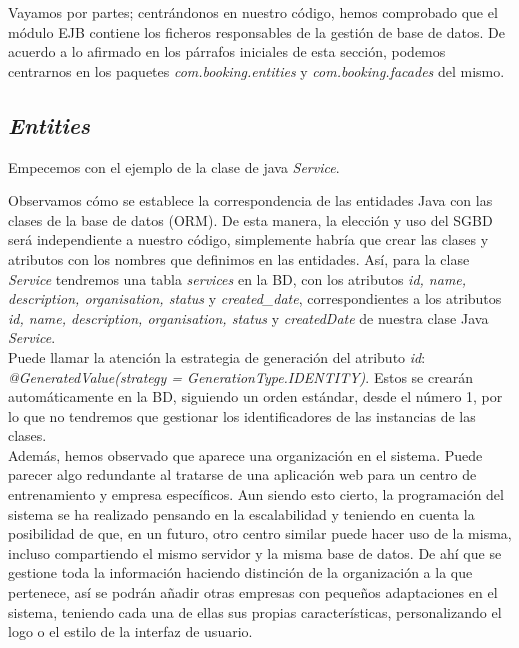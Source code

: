 Vayamos por partes; centrándonos en nuestro código, hemos comprobado que el módulo EJB contiene los ficheros responsables de la gestión de base de datos. De acuerdo a lo afirmado en los párrafos iniciales de esta sección, podemos centrarnos en los paquetes \textit{com.booking.entities} y \textit{com.booking.facades} del mismo. \\

\subsection{\textit{Entities}} \label{subsec:entities}

Empecemos con el ejemplo de la clase de java \textit{Service}.



Observamos cómo se establece la correspondencia de las entidades Java con las clases de la base de datos (ORM). De esta manera, la elección y uso del SGBD será independiente a nuestro código, simplemente habría que crear las clases y atributos con los nombres que definimos en las entidades. Así, para la clase \textit{Service} tendremos una tabla \textit{services} en la BD, con los atributos \textit{id, name, description, organisation, status} y \textit{created\_date}, correspondientes a los atributos \textit{id, name, description, organisation, status} y \textit{createdDate} de nuestra clase Java \textit{Service}. \\

Puede llamar la atención la estrategia de generación del atributo \textit{id}: \textit{@GeneratedValue(strategy = GenerationType.IDENTITY)}. Estos se crearán automáticamente en la BD, siguiendo un orden estándar, desde el número 1, por lo que no tendremos que gestionar los identificadores de las instancias de las clases. \\

Además, hemos observado que aparece una organización en el sistema. Puede parecer algo redundante al tratarse de una aplicación web para un centro de entrenamiento y empresa específicos. Aun siendo esto cierto, la programación del sistema se ha realizado pensando en la escalabilidad y teniendo en cuenta la posibilidad de que, en un futuro, otro centro similar puede hacer uso de la misma, incluso compartiendo el mismo servidor y la misma base de datos. De ahí que se gestione toda la información haciendo distinción de la organización a la que pertenece, así se podrán añadir otras empresas con pequeños adaptaciones en el sistema, teniendo cada una de ellas sus propias características, personalizando el logo o el estilo de la interfaz de usuario.

